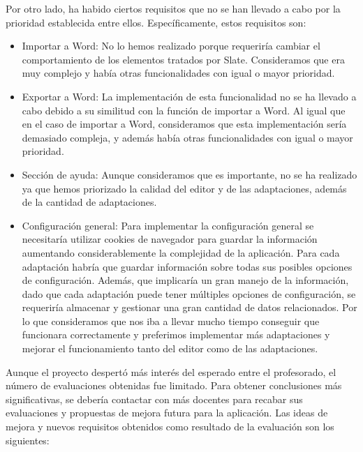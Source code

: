 Por otro lado, ha habido ciertos requisitos que no se han llevado a cabo por la prioridad establecida entre ellos. Específicamente, estos requisitos son:
\begin{itemize}
    \item Importar a Word: No lo hemos realizado porque requeriría cambiar el comportamiento de los elementos tratados por Slate. Consideramos que era muy complejo y había otras funcionalidades con igual o mayor prioridad.
    \item Exportar a Word: La implementación de esta funcionalidad no se ha llevado a cabo debido a su similitud con la función de importar a Word. Al igual que en el caso de importar a Word, consideramos que esta implementación sería demasiado compleja, y además había otras funcionalidades con igual o mayor prioridad.
    \item Sección de ayuda: Aunque consideramos que es importante, no se ha realizado ya que hemos priorizado la calidad del editor y de las adaptaciones, además de la cantidad de adaptaciones.
    \item Configuración general: Para implementar la configuración general se necesitaría utilizar cookies de navegador para guardar la información aumentando considerablemente la complejidad de la aplicación. Para cada adaptación habría que guardar información sobre todas sus posibles opciones de configuración. Además, que implicaría un gran manejo de la información, dado que cada adaptación puede tener múltiples opciones de configuración, se requeriría almacenar y gestionar una gran cantidad de datos relacionados. Por lo que consideramos que nos iba a llevar mucho tiempo conseguir que funcionara correctamente y preferimos implementar más adaptaciones y mejorar el funcionamiento tanto del editor como de las adaptaciones.
\end{itemize}

Aunque el proyecto despertó más interés del esperado entre el profesorado, el número de evaluaciones obtenidas fue limitado. Para obtener conclusiones más significativas, se debería contactar con más docentes para recabar sus evaluaciones y propuestas de mejora futura para la aplicación. Las ideas de mejora y nuevos requisitos obtenidos como resultado de la evaluación son los siguientes:

